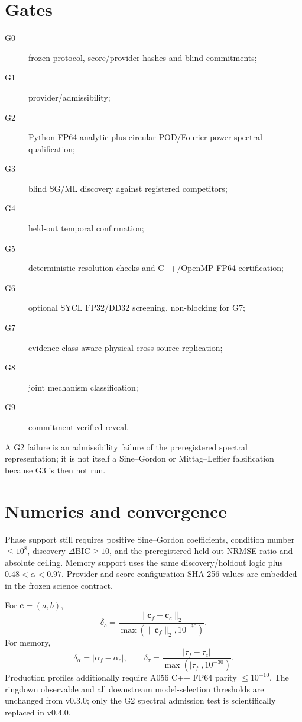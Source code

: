 \documentclass[11pt,a4paper]{article}
\begin{document}
\section{Gates}
\begin{description}
\item[G0] frozen protocol, score/provider hashes and blind commitments;
\item[G1] provider/admissibility;
\item[G2] Python-FP64 analytic plus circular-POD/Fourier-power spectral qualification;
\item[G3] blind SG/ML discovery against registered competitors;
\item[G4] held-out temporal confirmation;
\item[G5] deterministic resolution checks and C++/OpenMP FP64 certification;
\item[G6] optional SYCL FP32/DD32 screening, non-blocking for G7;
\item[G7] evidence-class-aware physical cross-source replication;
\item[G8] joint mechanism classification;
\item[G9] commitment-verified reveal.
\end{description}
A G2 failure is an admissibility failure of the preregistered spectral representation; it is not itself a Sine--Gordon or Mittag--Leffler falsification because G3 is then not run.

\section{Numerics and convergence}
Phase support still requires positive Sine--Gordon coefficients, condition number $\le10^8$, discovery $\Delta\mathrm{BIC}\ge10$, and the preregistered held-out NRMSE ratio and absolute ceiling. Memory support uses the same discovery/holdout logic plus $0.48<\alpha<0.97$. Provider and score configuration SHA-256 values are embedded in the frozen science contract.

For $\mathbf c=(a,b)$,
\[
\delta_c=\frac{\|\mathbf c_f-\mathbf c_c\|_2}{\max(\|\mathbf c_f\|_2,10^{-30})}.
\]
For memory,
\[
\delta_\alpha=|\alpha_f-\alpha_c|,\qquad
\delta_\tau=\frac{|\tau_f-\tau_c|}{\max(|\tau_f|,10^{-30})}.
\]
Production profiles additionally require A056 C++ FP64 parity $\le10^{-10}$. The ringdown observable and all downstream model-selection thresholds are unchanged from v0.3.0; only the G2 spectral admission test is scientifically replaced in v0.4.0.
\end{document}
